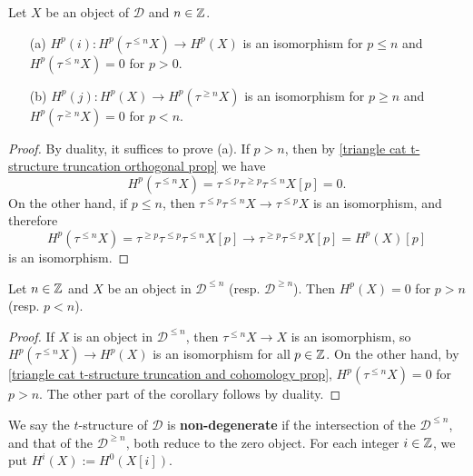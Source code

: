 \begin{proposition}\label{triangle cat t-structure truncation and cohomology prop}
Let $X$ be an object of $\mathcal{D}$ and $n\in\mathbb{Z}$.
\begin{enumerate}
    \item[(a)] $H^p(i):H^p(\tau^{\leq n}X)\to H^p(X)$ is an isomorphism for $p\leq n$ and $H^p(\tau^{\leq n}X)=0$ for $p>0$.
    \item[(b)] $H^p(j):H^p(X)\to H^p(\tau^{\geq n}X)$ is an isomorphism for $p\geq n$ and $H^p(\tau^{\geq n}X)=0$ for $p<n$.
\end{enumerate}
\end{proposition}
\begin{proof}
By duality, it suffices to prove (a). If $p>n$, then by \cref{triangle cat t-structure truncation orthogonal prop} we have
\[H^p(\tau^{\leq n}X)=\tau^{\leq p}\tau^{\geq p}\tau^{\leq n}X[p]=0.\]
On the other hand, if $p\leq n$, then $\tau^{\leq p}\tau^{\leq n}X\to\tau^{\leq p}X$ is an isomorphism, and therefore
\[H^p(\tau^{\leq n}X)=\tau^{\geq p}\tau^{\leq p}\tau^{\leq n}X[p]\to\tau^{\geq p}\tau^{\leq p}X[p]=H^p(X)[p]\]
is an isomorphism.
\end{proof}

\begin{corollary}\label{triangle cat t-structure cohomology of D^geq n}
Let $n\in\mathbb{Z}$ and $X$ be an object in $\mathcal{D}^{\leq n}$ (resp. $\mathcal{D}^{\geq n}$). Then $H^p(X)=0$ for $p>n$ (resp. $p<n$).
\end{corollary}
\begin{proof}
If $X$ is an object in $\mathcal{D}^{\leq n}$, then $\tau^{\leq n}X\to X$ is an isomorphism, so $H^p(\tau^{\leq n}X)\to H^p(X)$ is an isomorphism for all $p\in\mathbb{Z}$. On the other hand, by \cref{triangle cat t-structure truncation and cohomology prop}, $H^p(\tau^{\leq n}X)=0$ for $p>n$. The other part of the corollary follows by duality.
\end{proof}

We say the $t$-structure of $\mathcal{D}$ is \textbf{non-degenerate} if the intersection of the $\mathcal{D}^{\leq n}$, and that of the $\mathcal{D}^{\geq n}$, both reduce to the zero object. For each integer $i\in\mathbb{Z}$, we put $H^i(X):=H^0(X[i])$.

